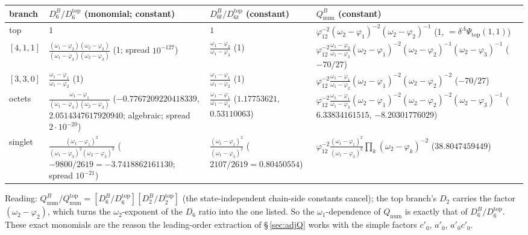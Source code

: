 \documentclass[10pt]{article}
\begin{document}
\begin{center}\footnotesize\setlength{\tabcolsep}{3pt}\begin{longtable}{@{}p{1.3cm}p{5.2cm}p{3.2cm}p{5.3cm}@{}}\toprule
\textbf{branch} & \textbf{$D_6^B/D_6^{\mathrm{top}}$ (monomial; constant)} & \textbf{$D_{6t}^B/D_{6t}^{\mathrm{top}}$ (constant)} & \textbf{$Q_{\mathrm{num}}^B$ (constant)} \\\midrule\endhead
top & $1$ & $1$ & $\varphi_{12}^{-2}(\omega_2-\varphi_1)^{-2}(\omega_2-\varphi_2)^{-1}$ (1, $=\delta^\Lambda\Psi_{\mathrm{top}}(1,1)$) \\
$[4,1,1]$ & $\frac{(\omega_1-\varphi_2)(\omega_2-\varphi_2)}{(\omega_1-\varphi_3)(\omega_2-\varphi_3)}$ (1; spread $10^{-127}$) & $\frac{\omega_1-\varphi_2}{\omega_1-\varphi_3}$ (1) & $\varphi_{12}^{-2}\frac{\omega_1-\varphi_2}{\omega_1-\varphi_3}(\omega_2-\varphi_1)^{-2}(\omega_2-\varphi_2)^{-1}(\omega_2-\varphi_3)^{-1}$ ($-70/27$) \\
$[3,3,0]$ & $\frac{\omega_1-\varphi_1}{\omega_1-\varphi_2}$ (1) & $\frac{\omega_1-\varphi_1}{\omega_1-\varphi_2}$ (1) & $\varphi_{12}^{-2}\frac{\omega_1-\varphi_1}{\omega_1-\varphi_2}(\omega_2-\varphi_1)^{-2}(\omega_2-\varphi_2)^{-2}$ ($-70/27$) \\
octets & $\frac{\omega_1-\varphi_1}{(\omega_1-\varphi_3)(\omega_2-\varphi_3)}$ ($-0.7767209220418339$, $2.0514347617920940$; algebraic; spread $2\cdot10^{-20}$) & $\frac{\omega_1-\varphi_1}{\omega_1-\varphi_3}$ ($1.17753621$, $0.53110063$) & $\varphi_{12}^{-2}\frac{\omega_1-\varphi_1}{\omega_1-\varphi_3}(\omega_2-\varphi_1)^{-2}(\omega_2-\varphi_2)^{-2}(\omega_2-\varphi_3)^{-1}$ ($6.33834161515$, $-8.20301776029$) \\
singlet & $\frac{(\omega_1-\varphi_1)^2}{(\omega_1-\varphi_3)^2(\omega_2-\varphi_3)^2}$ ($-9800/2619=-3.7418862161130$; spread $10^{-21}$) & $\frac{(\omega_1-\varphi_1)^2}{(\omega_1-\varphi_3)^2}$ ($2107/2619=0.80450554$) & $\varphi_{12}^{-2}\frac{(\omega_1-\varphi_1)^2}{(\omega_1-\varphi_3)^2}\prod_k(\omega_2-\varphi_k)^{-2}$ ($38.8047459449$) \\
\bottomrule\end{longtable}\end{center}

Reading: $Q_{\mathrm{num}}^B/Q_{\mathrm{num}}^{\mathrm{top}}=[D_6^B/D_6^{\mathrm{top}}][D_2^B/D_2^{\mathrm{top}}]$ (the state-independent chain-side constants cancel); the top branch's $D_2$ carries the factor $(\omega_2-\varphi_2)$, which turns the $\omega_2$-exponent of the $D_6$ ratio into the one listed. So the $\omega_1$-dependence of $Q_{\mathrm{num}}$ is exactly that of $D_6^B/D_6^{\mathrm{top}}$. These exact monomials are the reason the leading-order extraction of \S\,\ref{sec:adjQ} works with the simple factors $c'_0$, $a'_0$, $a'_0c'_0$.
\end{document}
